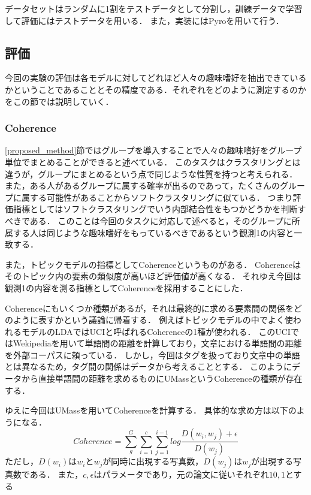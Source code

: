 \documentclass[a4j,10pt, twocolumn]{jarticle}
\begin{document}
データセットはランダムに1割をテストデータとして分割し，訓練データで学習して評価にはテストデータを用いる．
また，実装にはPyroを用いて行う．

\subsection{評価} \label{evaluation}
今回の実験の評価は各モデルに対してどれほど人々の趣味嗜好を抽出できているかということであることとその精度である．それぞれをどのように測定するのかをこの節では説明していく．

\subsubsection{Coherence} \label{coherence}
\ref{proposed_method}節ではグループを導入することで人々の趣味嗜好をグループ単位でまとめることができると述べている．
このタスクはクラスタリングとは違うが，グループにまとめるという点で同じような性質を持つと考えられる．
また，ある人があるグループに属する確率が出るのであって，たくさんのグループに属する可能性があることからソフトクラスタリングに似ている．
つまり評価指標としてはソフトクラスタリングでいう内部結合性をもつかどうかを判断すべきである．
このことは今回のタスクに対応して述べると，そのグループに所属する人は同じような趣味嗜好をもっているべきであるという観測1の内容と一致する．

また，トピックモデルの指標としてCoherence\cite{first-coherence}というものがある．
Coherenceはそのトピック内の要素の類似度が高いほど評価値が高くなる．
それゆえ今回は観測1の内容を測る指標としてCoherenceを採用することにした．

Coherenceにもいくつか種類があるが，それは最終的に求める要素間の関係をどのように表すかという議論に帰着する．
例えばトピックモデルの中でよく使われるモデルのLDA\cite{blei2003latent}ではUCI\cite{newman2010automatic}と呼ばれるCoherenceの1種が使われる．
このUCIではWekipediaを用いて単語間の距離を計算しており，文章における単語間の距離を外部コーパスに頼っている．
しかし，今回はタグを扱っており文章中の単語とは異なるため，タグ間の関係はデータから考えることとする．
このようにデータから直接単語間の距離を求めるものにUMass\cite{mimno2011optimizing}というCoherenceの種類が存在する．

ゆえに今回はUMassを用いてCoherenceを計算する．
具体的な求め方は以下のようになる．
\begin{equation*}
  Coherence = \sum_g^G \sum_{i=1}^c \sum_{j=1}^{i-1} log \frac{D(w_i, w_j) + \epsilon}{D(w_j)}
\end{equation*}
ただし，$D(w_i)$は$w_i$と$w_j$が同時に出現する写真数，$D(w_j)$は$w_j$が出現する写真数である．
また，$c, \epsilon$はパラメータであり，元の論文\cite{mimno2011optimizing}に従いそれぞれ$10, 1$とする
\end{document}
